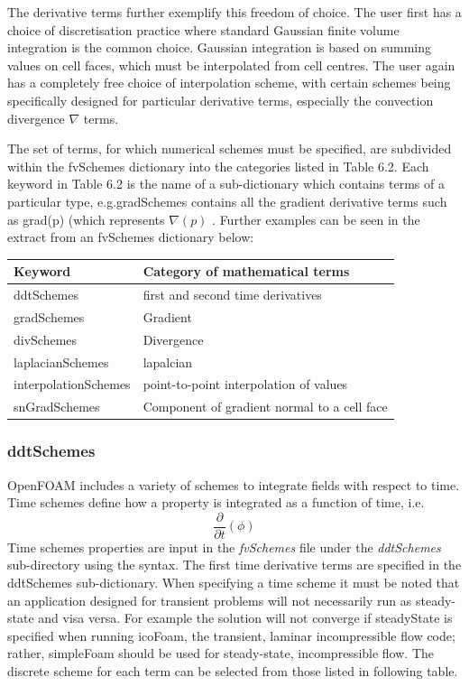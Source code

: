 \documentclass{article}
\begin{document}
The derivative terms further exemplify this freedom of choice. The user first has a choice of discretisation practice where standard Gaussian finite volume integration is the common choice. Gaussian integration is based on summing values on cell faces, which must be interpolated from cell centres. The user again has a completely free choice of interpolation scheme, with certain schemes being specifically designed for particular derivative terms, especially the convection divergence $\nabla$ terms.

The set of terms, for which numerical schemes must be specified, are subdivided within the fvSchemes dictionary into the categories listed in Table 6.2. Each keyword in Table 6.2 is the name of a sub-dictionary which contains terms of a particular type, e.g.gradSchemes contains all the gradient derivative terms such as grad(p) (which represents $\nabla (p)$ . Further examples can be seen in the extract from an fvSchemes dictionary below:

\begin{tabular}{l | l}
\hline 
Keyword & Category of mathematical terms \\
\hline 
ddtSchemes  & first and second time derivatives \\
gradSchemes  & Gradient \\
divSchemes  & Divergence \\
laplacianSchemes & lapalcian \\
interpolationSchemes & point-to-point interpolation of values \\
snGradSchemes & Component of gradient normal to a cell face \\
\hline
\end{tabular}

\subsubsection{ddtSchemes}

OpenFOAM includes a variety of schemes to integrate fields with respect to time.
Time schemes define how a property is integrated as a function of time, i.e.
\begin{equation}
\frac{\partial}{\partial t}(\phi)
\end{equation}
Time schemes properties are input in the \textit{fvSchemes} file under the \textit{ddtSchemes} sub-directory using the syntax. The first time derivative  terms are specified in the ddtSchemes sub-dictionary. When specifying a time scheme it must be noted that an application designed for transient problems will not necessarily run as steady-state and visa versa. For example the solution will not converge if steadyState is specified when running icoFoam, the transient, laminar incompressible flow code; rather, simpleFoam should be used for steady-state, incompressible flow. The discrete scheme for each term can be selected from those listed in following table.
\end{document}
